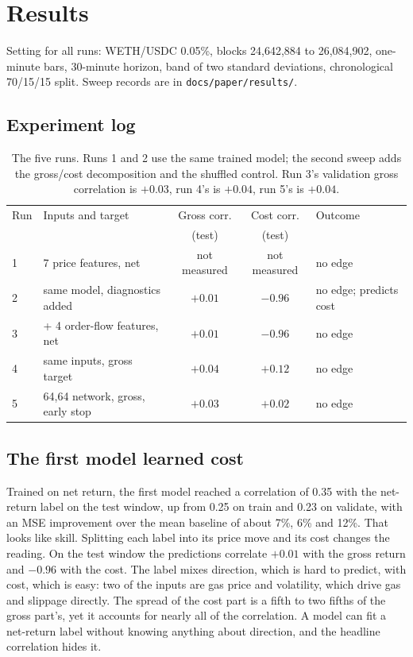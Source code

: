 \documentclass[11pt,a4paper]{article}
\begin{document}
\section{Results}
\label{sec:results}

Setting for all runs: WETH/USDC 0.05\%, blocks 24,642,884 to 26,084,902,
one-minute bars, 30-minute horizon, band of two standard deviations,
chronological 70/15/15 split. Sweep records are in \texttt{docs/paper/results/}.

\subsection{Experiment log}

\begin{table}[h]
\centering
\small
\begin{tabular}{@{}llccl@{}}
\toprule
Run & Inputs and target & Gross corr. & Cost corr. & Outcome \\
    &                   & (test)      & (test)     & \\
\midrule
1 & 7 price features, net & not measured & not measured & no edge \\
2 & same model, diagnostics added & $+0.01$ & $-0.96$ & no edge; predicts cost \\
3 & + 4 order-flow features, net & $+0.01$ & $-0.96$ & no edge \\
4 & same inputs, gross target & $+0.04$ & $+0.12$ & no edge \\
5 & 64,64 network, gross, early stop & $+0.03$ & $+0.02$ & no edge \\
\bottomrule
\end{tabular}
\caption{The five runs. Runs 1 and 2 use the same trained model; the second
sweep adds the gross/cost decomposition and the shuffled control. Run 3's
validation gross correlation is $+0.03$, run 4's is $+0.04$, run 5's is $+0.04$.}
\label{tab:runs}
\end{table}

\subsection{The first model learned cost}

Trained on net return, the first model reached a correlation of 0.35 with the
net-return label on the test window, up from 0.25 on train and 0.23 on
validate, with an MSE improvement over the mean baseline of about 7\%, 6\% and
12\%. That looks like skill. Splitting each label into its price move and its
cost changes the reading. On the test window the predictions correlate $+0.01$
with the gross return and $-0.96$ with the cost. The label mixes direction,
which is hard to predict, with cost, which is easy: two of the inputs are gas
price and volatility, which drive gas and slippage directly. The spread of the
cost part is a fifth to two fifths of the gross part's, yet it accounts for
nearly all of the correlation. A model can fit a net-return label without
knowing anything about direction, and the headline correlation hides it.
\end{document}
